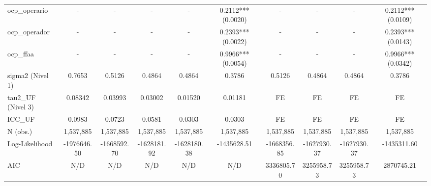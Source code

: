 \begin{table}
\begin{tabular}{lccccccccc}
ocp_operario & - & - & - & - & 0.2112*** (0.0020) & - & - & - & 0.2112*** (0.0109) \\
ocp_operador & - & - & - & - & 0.2393*** (0.0022) & - & - & - & 0.2393*** (0.0143) \\
ocp_ffaa & - & - & - & - & 0.9966*** (0.0054) & - & - & - & 0.9966*** (0.0342) \\
sigma2 (Nivel 1) & 0.7653 & 0.5126 & 0.4864 & 0.4864 & 0.3786 & 0.5126 & 0.4864 & 0.4864 & 0.3786 \\
tau2_UF (Nivel 3) & 0.08342 & 0.03993 & 0.03002 & 0.01520 & 0.01181 & FE & FE & FE & FE \\
ICC_UF & 0.0983 & 0.0723 & 0.0581 & 0.0303 & 0.0303 & FE & FE & FE & FE \\
N (obs.) & 1,537,885 & 1,537,885 & 1,537,885 & 1,537,885 & 1,537,885 & 1,537,885 & 1,537,885 & 1,537,885 & 1,537,885 \\
Log-Likelihood & -1976646.50 & -1668592.70 & -1628181.92 & -1628180.38 & -1435628.51 & -1668356.85 & -1627930.37 & -1627930.37 & -1435311.60 \\
AIC & N/D & N/D & N/D & N/D & N/D & 3336805.70 & 3255958.73 & 3255958.73 & 2870745.21 \\
\bottomrule
\end{tabular}
\end{table}
